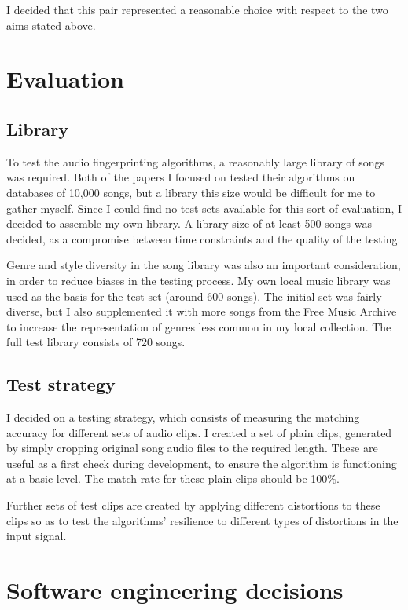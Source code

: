 \documentclass[12pt,a4paper,twoside,openright]{report}
\begin{document}
I decided that this pair represented a reasonable choice with respect to the two aims stated above.


\section{Evaluation}

\subsection{Library}

To test the audio fingerprinting algorithms, a reasonably large library of songs was required. Both of the papers I focused on tested their algorithms on databases of 10,000 songs, but a library this size would be difficult for me to gather myself. Since I could find no test sets available for this sort of evaluation, I decided to assemble my own library. A library size of at least 500 songs was decided, as a compromise between time constraints and the quality of the testing.

Genre and style diversity in the song library was also an important consideration, in order to reduce biases in the testing process. My own local music library was used as the basis for the test set (around 600 songs). The initial set was fairly diverse, but I also supplemented it with more songs from the Free Music Archive to increase the representation of genres less common in my local collection. The full test library consists of 720 songs.

\subsection{Test strategy}

I decided on a testing strategy, which consists of measuring the matching accuracy for different sets of audio clips. I created a set of plain clips, generated by simply cropping original song audio files to the required length. These are useful as a first check during development, to ensure the algorithm is functioning at a basic level. The match rate for these plain clips should be 100\%.

Further sets of test clips are created by applying different distortions to these clips so as to test the algorithms' resilience to different types of distortions in the input signal.



\section{Software engineering decisions}
\end{document}
